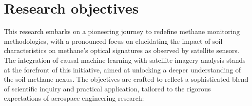 \section{Research objectives}

This research embarks on a pioneering journey to redefine methane monitoring methodologies, with a pronounced focus on elucidating the impact of soil characteristics on methane's optical signatures as observed by satellite sensors. The integration of causal machine learning with satellite imagery analysis stands at the forefront of this initiative, aimed at unlocking a deeper understanding of the soil-methane nexus. The objectives are crafted to reflect a sophisticated blend of scientific inquiry and practical application, tailored to the rigorous expectations of aerospace engineering research:

